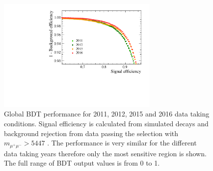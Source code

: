 \begin{figure}[tbp]
    \centering
       \includegraphics[width=0.7\textwidth]{./Figs/Selection/ROC_zoom.pdf}
        \caption{Global BDT performance for 2011, 2012, 2015 and 2016 data taking conditions. Signal efficiency is calculated from \bsmumu simulated decays and background rejection from data passing the \bsmumu selection with $m_{\mu^{+}\mu^{-}} > 5447$ \mevcc. The performance is very similar for the different data taking years therefore only the most sensitive region is shown. The full range of BDT output values is from 0 to 1.}
    \label{fig:BDTperformance}
\end{figure}


